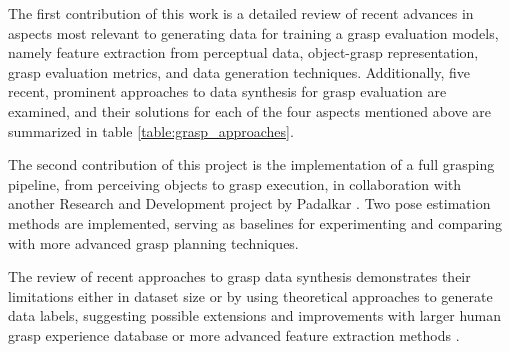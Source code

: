 \documentclass[runningheads]{llncs}
\begin{document}
The first contribution of this work is a detailed review of recent advances in aspects most relevant to generating data
for training a grasp evaluation models, namely feature extraction from perceptual data, object-grasp representation,
grasp evaluation metrics, and data generation techniques. Additionally, five recent, prominent approaches to data
synthesis for grasp evaluation are examined, and their solutions for each of the four aspects mentioned above are
summarized in table \ref{table:grasp_approaches}.

The second contribution of this project is the implementation of a full grasping pipeline, from perceiving objects to
grasp execution, in collaboration with another Research and Development project by Padalkar \cite{Padalkar2018}. Two
pose estimation methods are implemented, serving as baselines for experimenting and comparing with more advanced grasp
planning techniques.

The review of recent approaches to grasp data synthesis demonstrates their limitations either in dataset size or by
using theoretical approaches to generate data labels, suggesting possible extensions and improvements with larger human
grasp experience database \cite{Saudabayev2018} or more advanced feature extraction methods \cite{Varley2017}.

%


%
\end{document}
